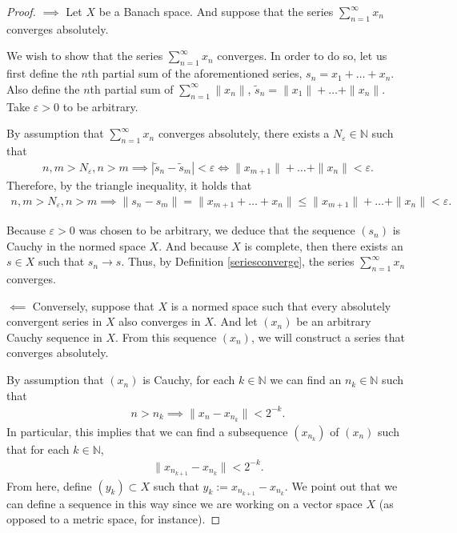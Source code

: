 \documentclass[11pt]{article}
\theoremstyle{mystyle}
\newcommand{\0}{\mathbf{0}}
\begin{document}
\begin{proof}
$\implies$ Let $X$ be a Banach space. And suppose that the series $\sum_{n=1}^{\infty} x_n$ converges absolutely. 

We wish to show that the series $\sum_{n=1}^{\infty} x_n$ converges. In order to do so, let us first define the $n$th partial sum of the aforementioned series, $s_n = x_1 + \ldots + x_n$. Also define the $n$th partial sum of  $\sum_{n=1}^{\infty} \|x_n\|$, $\tilde{s}_n = \|x_1\| + \ldots + \|x_n\|$. Take $\varepsilon > 0$ to be arbitrary. 

By assumption that $\sum_{n=1}^{\infty} x_n$ converges absolutely, there exists a $N_{\varepsilon} \in \mathbb{N}$ such that
\begin{align*}
    n, m > N_{\varepsilon}, n > m \implies |\tilde{s}_n - \tilde{s}_m| < \varepsilon \iff \|x_{m+1}\| + \ldots + \|x_n\| < \varepsilon.
\end{align*}
Therefore, by the triangle inequality, it holds that
\begin{align*}
    n, m > N_{\varepsilon}, n > m \implies \|s_n - s_m\|  = \| x_{m+1} + \ldots + x_n\| \leq \|x_{m+1}\| + \ldots + \|x_n\| < \varepsilon.
\end{align*}

Because $\varepsilon > 0$ was chosen to be arbitrary, we deduce that the sequence $(s_n)$ is Cauchy in the normed space $X$. And because $X$ is complete, then there exists an $s \in X$ such that $s_n \longrightarrow s$. Thus, by Definition \ref{seriesconverge}, the series $\sum_{n=1}^{\infty} x_n$ converges.

$\impliedby$ Conversely, suppose that $X$ is a normed space such that every absolutely convergent series in $X$ also converges in $X$. And let $(x_n)$ be an arbitrary Cauchy sequence in $X$. From this sequence $(x_n)$, we will construct a series that converges absolutely. 

By assumption that $(x_n)$ is Cauchy, for each $k \in \mathbb{N}$ we can find an $n_k \in \mathbb{N}$ such that
\begin{align*}
    n > n_k \implies \|x_n - x_{n_k}\| < 2^{-k}.
\end{align*}
In particular, this implies that we can find a subsequence $(x_{n_k})$ of $(x_n)$ such that for each $k \in \mathbb{N}$,
\begin{align*}
    \|x_{n_{k+1}} - x_{n_k}\| <  2^{-k}.
\end{align*}
From here, define $(y_k) \subset X$ such that $y_k := x_{n_{k+1}} - x_{n_k}$. We point out that we can define a sequence in this way since we are working on a vector space $X$ (as opposed to a metric space, for instance). 


\end{proof}
\end{document}
